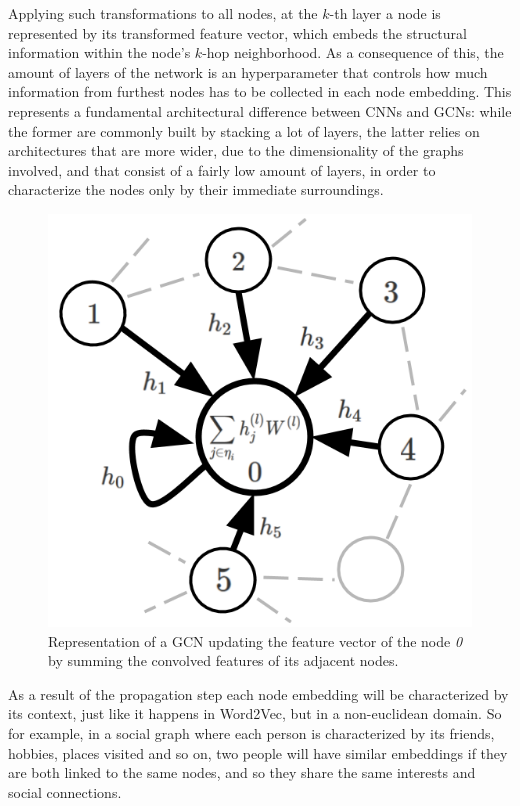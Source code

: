 \documentclass[%
    corpo=13.5pt,
    twoside,
    oldstyle,
    tipotesi=magistrale,
    greek,
    evenboxes
]{toptesi}
\begin{document}
Applying such transformations to all nodes, at the
$k$-th layer a node is represented by its transformed feature vector, which
embeds the structural information within the node's $k$-hop neighborhood.
As a consequence of this, the amount of layers of the network is an
hyperparameter that controls how much information from furthest nodes has to be
collected in each node embedding.
This represents a fundamental architectural difference between CNNs and GCNs:
while the former are commonly built by stacking a lot of layers, the latter
relies on architectures that are more wider, due to the dimensionality of the
graphs involved, and that consist of a fairly low amount of layers, in order to
characterize the nodes only by their immediate surroundings.


\begin{figure}[h]
    \centering
    \includegraphics[scale=0.4]{img/gcn.png}
    \caption{Representation of a GCN updating the feature vector of the node \emph{0}
        by summing the convolved features of its adjacent nodes.}
    \label{fig:gcn}
\end{figure}

As a result of the propagation step each node embedding will be characterized by
its context, just like it happens in Word2Vec, but in a non-euclidean domain.
So for example, in a social graph where each person is characterized by its
friends, hobbies, places visited and so on, two people will have similar
embeddings if they are both linked to the same nodes, and so they share the
same interests and social connections.
\end{document}
